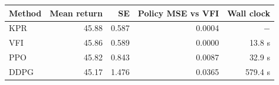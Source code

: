\begin{tabular}{lrrrr}
\toprule
Method & Mean return & SE & Policy MSE vs VFI & Wall clock \\
\midrule
KPR & 45.88 & 0.587 & 0.0004 & $-$ \\
VFI & 45.86 & 0.589 & 0.0000 & 13.8 s \\
PPO & 45.82 & 0.843 & 0.0087 & 32.9 s \\
DDPG & 45.17 & 1.476 & 0.0365 & 579.4 s \\
\bottomrule
\end{tabular}
